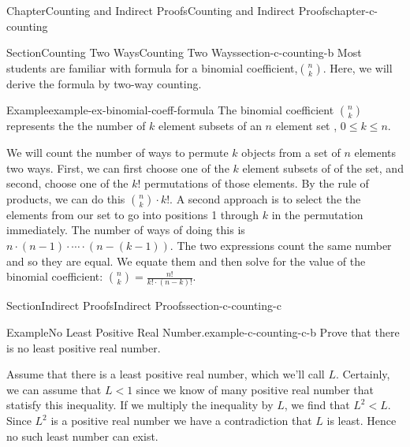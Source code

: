 \documentclass[oneside,10pt,]{book}
\numberwithin{equation}{section}
\newcommand{\lt}{<}
\begin{document}
\begin{chapterptx}{Chapter}{Counting and Indirect Proofs}{}{Counting and Indirect Proofs}{}{}{chapter-c-counting}
\renewcommand*{\chaptername}{Chapter}
%
%
\typeout{************************************************}
\typeout{************************************************}
%
\begin{sectionptx}{Section}{Counting Two Ways}{}{Counting Two Ways}{}{}{section-c-counting-b}
Most students are familiar with formula for a binomial coefficient,\(\binom{n}{k}\). Here, we will derive the formula by two-way counting.%
\begin{example}{Example}{}{example-ex-binomial-coeff-formula}%
The binomial coefficient \(\binom{n}{k}\) represents the  the number of \(k\) element subsets of an \(n\) element set , \(0\leq k\leq n\).%
\par
We will count the number of ways to permute \(k\)  objects from a set of \(n\) elements two ways.  First, we can first choose one of the \(k\) element subsets of of the set, and second, choose one of the \(k!\)  permutations of those elements. By the rule of products, we can do this \(\binom{n}{k} \cdot k!\).  A second approach is to select the the elements from our set to go into positions 1 through \(k\) in the permutation immediately.  The number of ways of doing this is \(n \cdot (n-1)\cdot \cdots \cdot (n-(k-1))\).   The two expressions count the same number and so they are equal. We equate them and then solve for the value of the  binomial coefficient:  \(\binom{n}{k} =\frac{n!}{k! \cdot (n-k)!}\).%
\end{example}
\end{sectionptx}
%
%
\typeout{************************************************}
\typeout{************************************************}
%
\begin{sectionptx}{Section}{Indirect Proofs}{}{Indirect Proofs}{}{}{section-c-counting-c}
\begin{example}{Example}{No Least Positive Real Number.}{example-c-counting-c-b}%
Prove that there is no least positive real number.%
\par
Assume that there is a least positive real number, which we'll call \(L\).  Certainly, we can assume that \(L \lt 1\) since we know of many positive real number that statisfy this inequality.  If we multiply the inequality by \(L\), we find that \(L^2 \lt L\).  Since \(L^2\) is a positive real number we have a contradiction that \(L\) is least.  Hence no such least number can exist.%

\end{example}
\end{sectionptx}
\end{chapterptx}
\end{document}
